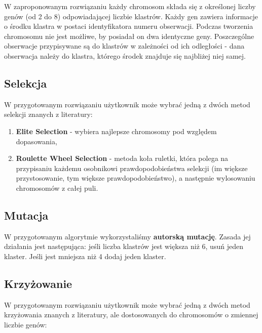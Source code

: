 \documentclass{classrep}
\begin{document}
W zaproponowanym rozwiązaniu każdy chromosom składa się z określonej liczby genów (od 2 do 8) odpowiadającej liczbie klastrów. Każdy gen zawiera informacje o środku klastra w postaci identyfikatora numeru obserwacji. Podczas tworzenia chromosomu nie jest możliwe, by posiadał on dwa identyczne geny. Poszczególne obserwacje przypisywane są do klastrów w zależności od ich odległości - dana obserwacja należy do klastra, którego środek znajduje się najbliżej niej samej. 


\subsection{Selekcja}

W przygotowanym rozwiązaniu użytkownik może wybrać jedną z dwóch metod selekcji znanych z literatury:

\begin{enumerate}
    \item \textbf{Elite Selection} - wybiera najlepsze chromosomy pod względem dopasowania,
    \item \textbf{Roulette Wheel Selection} - metoda koła ruletki, która polega na przypisaniu każdemu osobnikowi prawdopodobieństwa selekcji (im większe przystosowanie, tym większe prawdopodobieństwo), a następnie wylosowaniu chromosomów z całej puli.
\end{enumerate}

\subsection{Mutacja}

W przygotowanym algorytmie wykorzystaliśmy \textbf{autorską mutację}. Zasada jej działania jest następująca: jeśli liczba klastrów jest większa niż 6, usuń jeden klaster. Jeśli jest mniejsza niż 4 dodaj jeden klaster.

\subsection{Krzyżowanie}

W przygotowanym rozwiązaniu użytkownik może wybrać jedną z dwóch metod krzyżowania znanych z literatury, ale dostosowanych do chromosomów o zmiennej liczbie genów:
\end{document}
